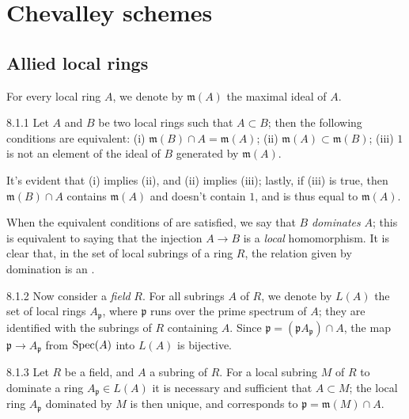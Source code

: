 \documentclass[10pt,oneside]{book}
\begin{document}
\section{Chevalley schemes}
\label{1-schemes-8}

\subsection{Allied local rings}
\label{1-schemes-8.1}

For every local ring $A$, we denote by $\mathfrak{m}(A)$ the maximal ideal of
$A$.

\begin{envs}[Lemma]{8.1.1}
\label{lem-1.8.1.1}
Let $A$ and $B$ be two local rings such that $A\subset B$;
then the following conditions are equivalent: (i)
$\mathfrak{m}(B)\cap A=\mathfrak{m}(A)$; (ii)
$\mathfrak{m}(A)\subset\mathfrak{m}(B)$; (iii) $1$ is not an element of
the ideal of $B$ generated by $\mathfrak{m}(A)$.
\end{envs}

It's evident that (i) implies (ii), and (ii) implies (iii); lastly, if (iii) is
true, then $\mathfrak{m}(B)\cap A$ contains $\mathfrak{m}(A)$ and doesn't
contain $1$, and is thus equal to $\mathfrak{m}(A)$.

When the equivalent conditions of  are satisfied, we say that $B$
\emph{dominates} $A$; this is equivalent to saying that the injection $A\to B$
is a \emph{local} homomorphism. It is clear that, in the set of local subrings
of a ring $R$, the relation given by domination is an .

\begin{env}{8.1.2}
\label{env-1.8.1.2}
Now consider a \emph{field} $R$. For all subrings $A$ of
$R$, we denote by $L(A)$ the set of local rings $A_\mathfrak{p}$, where
$\mathfrak{p}$ runs over the prime spectrum of $A$; they are identified with the
subrings of $R$ containing $A$. Since
$\mathfrak{p}=(\mathfrak{p}A_\mathfrak{p})\cap A$, the map $\mathfrak{p}\to
A_\mathfrak{p}$ from ${\mathop{\mathrm{Spec}}\nolimits}(A)$ into $L(A)$ is bijective.
\end{env}

\begin{envs}[Lemma]{8.1.3}
\label{lem-1.8.1.3}
Let $R$ be a field, and $A$ a subring of $R$. For a
local subring $M$ of $R$ to dominate a ring $A_\mathfrak{p}\in L(A)$ it is
necessary and sufficient that $A\subset M$; the local ring $A_\mathfrak{p}$
dominated by $M$ is then unique, and corresponds to
$\mathfrak{p}=\mathfrak{m}(M)\cap A$.
\end{envs}
\end{document}
